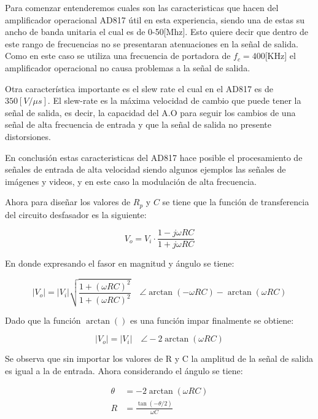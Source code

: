 \documentclass[letterpaper, titlepage]{article}
\providecommand{\abs}[1]{\lvert#1\rvert}
\begin{document}
	
		Para comenzar entenderemos cuales son las caracteristicas que hacen del amplificador operacional AD817 útil en esta experiencia, siendo una de estas su ancho de banda unitaria el cual es de 0-50[Mhz]. Esto quiere decir que dentro de este rango de frecuencias no se presentaran atenuaciones en la señal de salida. Como en este caso se utiliza una frecuencia de portadora de $f_{c} = 400$[KHz] el amplificador operacional no causa problemas a la señal de salida.

		Otra característica importante es el slew rate el cual en el AD817 es de $350[V/\mu s]$. El slew-rate es la máxima velocidad de cambio que puede tener la señal de salida, es decir, la capacidad del A.O para seguir los cambios de una señal de alta frecuencia de entrada y que la señal de salida no presente distorsiones.

		En conclusión estas caracteristicas del AD817 hace posible el procesamiento de señales de entrada de alta velocidad siendo algunos ejemplos las señales de imágenes y videos, y en este caso la modulación de alta frecuencia.

		Ahora para diseñar los valores de $ R_{p} $ y $C$ se tiene que la función de transferencia  del circuito desfasador es la siguiente:

		\begin{equation}
			V_{o} = V_{i} \cdot\frac{1- j \omega R C}{1 + j \omega R C}
		\end{equation}
	
		En donde expresando el fasor en magnitud y ángulo se tiene:

		\begin{equation*}
			\abs{V_{o}}  = \abs{V_{i}} \sqrt{\frac{1 +( \omega R C)^2}{1 +( \omega R C)^2}} \quad\angle \arctan(- \omega R C ) - \arctan(\omega R C )
		\end{equation*}

		Dado que la función $\arctan()$ es una función impar finalmente se obtiene:

		\begin{equation}
			\abs{V_{o}}  = \abs{V_{i}} \quad\angle -2 \arctan (\omega R C)
		\end{equation}
	
		Se observa que sin importar los valores de R y C la amplitud de la señal de salida es igual a la de entrada. Ahora considerando el ángulo se tiene:	

		\begin{align*}
			\theta & = -2 \arctan (\omega R C) \\
			R & = \frac{\tan( -\theta/2)}{ \omega C }\\
		\end{align*}
\end{document}
